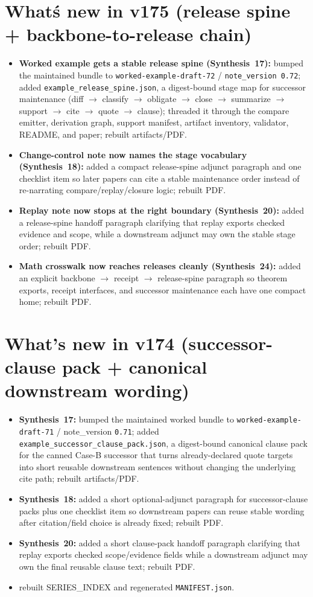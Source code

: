 \documentclass[11pt]{article}
\begin{document}
\section{What\'s new in v175 (release spine + backbone-to-release chain)}
\begin{itemize}[leftmargin=*]
\item \textbf{Worked example gets a stable release spine (Synthesis~17):} bumped the maintained bundle to \texttt{worked-example-draft-72} / \texttt{note\_version 0.72}; added \texttt{example\_release\_spine.json}, a digest-bound stage map for successor maintenance (diff $\to$ classify $\to$ obligate $\to$ close $\to$ summarize $\to$ support $\to$ cite $\to$ quote $\to$ clause); threaded it through the compare emitter, derivation graph, support manifest, artifact inventory, validator, README, and paper; rebuilt artifacts/PDF.
\item \textbf{Change-control note now names the stage vocabulary (Synthesis~18):} added a compact release-spine adjunct paragraph and one checklist item so later papers can cite a stable maintenance order instead of re-narrating compare/replay/closure logic; rebuilt PDF.
\item \textbf{Replay note now stops at the right boundary (Synthesis~20):} added a release-spine handoff paragraph clarifying that replay exports checked evidence and scope, while a downstream adjunct may own the stable stage order; rebuilt PDF.
\item \textbf{Math crosswalk now reaches releases cleanly (Synthesis~24):} added an explicit backbone $\to$ receipt $\to$ release-spine paragraph so theorem exports, receipt interfaces, and successor maintenance each have one compact home; rebuilt PDF.
\end{itemize}

\section{What's new in v174 (successor-clause pack + canonical downstream wording)}
\begin{itemize}[leftmargin=*]
\item \textbf{Synthesis~17:} bumped the maintained worked bundle to \texttt{worked-example-draft-71} / note\_version \texttt{0.71}; added \texttt{example\_successor\_clause\_pack.json}, a digest-bound canonical clause pack for the canned Case-B successor that turns already-declared quote targets into short reusable downstream sentences without changing the underlying cite path; rebuilt artifacts/PDF.
\item \textbf{Synthesis~18:} added a short optional-adjunct paragraph for successor-clause packs plus one checklist item so downstream papers can reuse stable wording after citation/field choice is already fixed; rebuilt PDF.
\item \textbf{Synthesis~20:} added a short clause-pack handoff paragraph clarifying that replay exports checked scope/evidence fields while a downstream adjunct may own the final reusable clause text; rebuilt PDF.
\item rebuilt SERIES\_INDEX and regenerated \texttt{MANIFEST.json}.
\end{itemize}
\end{document}
